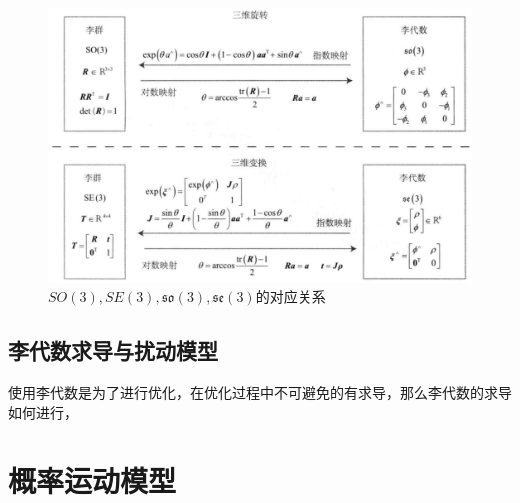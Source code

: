 \documentclass[10pt]{article}
\begin{document}
\begin{figure}[!htb]
    \includegraphics[width=\hsize]{images/对应关系.png}
    \caption{$SO(3),SE(3),\mathfrak{so}(3),\mathfrak{se}(3)$的对应关系} 
\end{figure}
\subsection{李代数求导与扰动模型}
使用李代数是为了进行优化，在优化过程中不可避免的有求导，那么李代数的求导如何进行，







 
\newpage
\section{概率运动模型}
\end{document}
